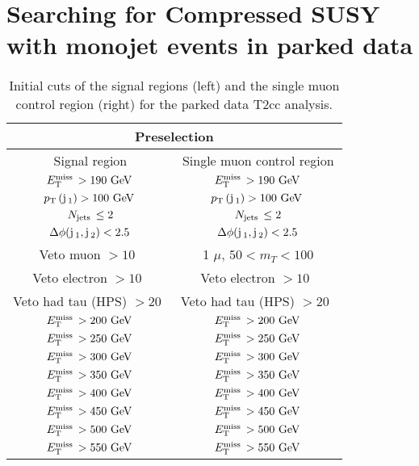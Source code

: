 \chapter{Searching for Compressed SUSY with monojet events in parked data}
\label{chap:parkeddata}


\begin{table}[h]
\small
\begin{tabular}{c|c}
\multicolumn{2}{c}{Preselection} \\ \hline
Signal region   & Single muon control region \\ \hline
$\MET > 190~\GeV$ 		  			 & $\MET > 190~\GeV$ \\ 
$\pt(\jet_{1}) > 100~\GeV$  		 & $\pt(\jet_{1}) > 100~\GeV$   \\ 
$\njets \leq 2$ 		   		     & $\njets \leq 2$  \\ 
$\Delta \phi (\jet_1, \jet_2) < 2.5$ &$ \Delta \phi (\jet_1, \jet_2) < 2.5$ \\
Veto muon $> 10$~\GeV  	  			 & 1 $\mu$, $50<m_{T}<100$\\ 
Veto electron $> 10$~\GeV   	     & Veto electron $> 10$~\GeV   \\ 
Veto had tau (HPS) $> 20$~\GeV 		 & Veto had tau (HPS) $> 20$~\GeV \\ 
$\MET > 200~\GeV$ 		  			 & $\MET > 200~\GeV$ \\ 
$\MET > 250~\GeV$ 		  			 & $\MET > 250~\GeV$ \\ 
$\MET > 300~\GeV$ 		  			 & $\MET > 300~\GeV$ \\ 
$\MET > 350~\GeV$ 		  			 & $\MET > 350~\GeV$ \\ 
$\MET > 400~\GeV$ 		  			 & $\MET > 400~\GeV$ \\ 
$\MET > 450~\GeV$ 		  			 & $\MET > 450~\GeV$ \\ 
$\MET > 500~\GeV$ 		  			 & $\MET > 500~\GeV$ \\ 
$\MET > 550~\GeV$ 		  			 & $\MET > 550~\GeV$ \\ 
\end{tabular}
\caption{\label{lumiProgramme} Initial cuts of the signal regions (left) and the single muon control region (right) for the parked data T2cc analysis.}
\end{table}
